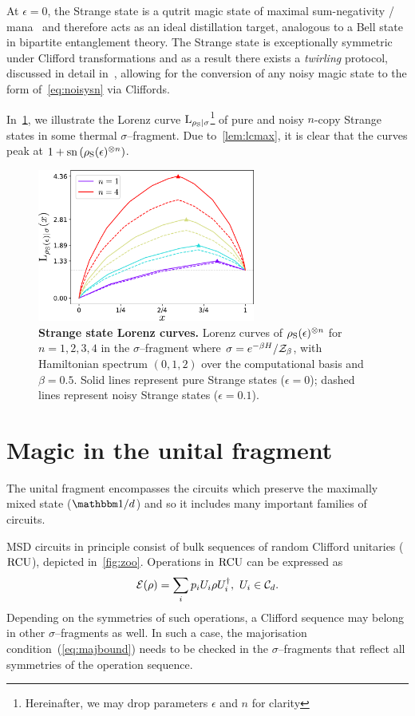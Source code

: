 \documentclass[pra,
aps,
twocolumn,
superscriptaddress,
groupedaddress,
nofootinbib,
reprint
]{revtex4-1}
\begin{document}
At $\epsilon=0$, the Strange state is a qutrit magic state of maximal sum-negativity / mana~\cite{cit:veitch2} and therefore acts as an ideal distillation target, analogous to a Bell state in bipartite entanglement theory.
The Strange state is exceptionally symmetric under Clifford transformations and as a result there exists a \emph{twirling} protocol, discussed in detail in~\cite{cit:prakash,cit:prakash2}, allowing for the conversion of any noisy magic state to the form of~\cref{eq:noisysn} via Cliffords.

In~\cref{fig:lcs}, we illustrate the Lorenz curve ${{\rm{L}}_{\rho_{\rm{S}}|\sigma}}$\footnote{Hereinafter, we may drop parameters $\epsilon$ and $n$ for clarity} of pure and noisy $n$-copy Strange states in some thermal $\sigma$--fragment.
Due to~\cref{lem:lcmax}, it is clear that the curves peak at $1 + {{\rm{sn}}\left(\rho_{\rm{S}}(\epsilon)^{\otimes n}\right)}$.
\begin{figure}
    \centering
    \includegraphics[height=5cm]{figs/lc_strange.pdf}
    \caption{\textbf{Strange state Lorenz curves.} Lorenz curves of $\rho_{\rm{S}}(\epsilon)^{\otimes n}$ for $n=1,2,3,4$ in the $\sigma$--fragment where $\sigma = e^{-\beta H}/\mathcal{Z}_{\beta}$, with Hamiltonian spectrum $(0,1,2)$ over the computational basis and $\beta = 0.5$.
    Solid lines represent pure Strange states ($\epsilon = 0$); dashed lines represent noisy Strange states ($\epsilon = 0.1$).
    }
    \label{fig:lcs}
\end{figure}

\section{Magic in the unital fragment}
\label{sec:unital}

The unital fragment encompasses the circuits which preserve the maximally mixed state ($\id/d$) and so it includes many important families of circuits.

MSD circuits in principle consist of bulk sequences of random Clifford unitaries (${\rm{RCU}}$), depicted in~\cref{fig:zoo}.
Operations in ${\rm{RCU}}$ can be expressed as
\begin{equation}
    \mathcal{E}(\rho) = \sum_i p_i U_i \rho U_i^\dagger,\ U_i \in \mathcal{C}_d.
\end{equation}
Depending on the symmetries of such operations, a Clifford sequence may belong in other $\sigma$--fragments as well.
In such a case, the majorisation condition~(\ref{eq:majbound}) needs to be checked in the $\sigma$--fragments that reflect all symmetries of the operation sequence.
\end{document}
